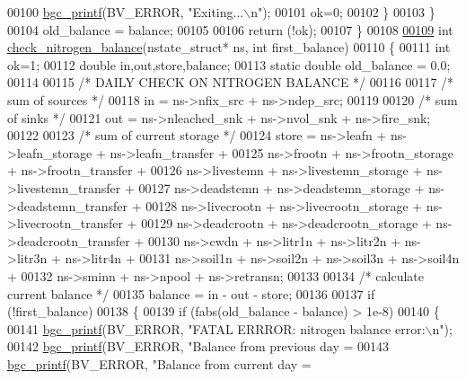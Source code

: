 \begin{DoxyCode}
{{{{{{{{{{{{00100             \hyperlink{bgc__io_8c_af287cce6e2aede1ce337de9319e80d0d}{bgc\_printf}(BV\_ERROR, \textcolor{stringliteral}{"Exiting...\(\backslash\)n"});
00101             ok=0;
00102         \}
00103     \}
00104     old\_balance = balance;
00105 
00106     \textcolor{keywordflow}{return} (!ok);
00107 \}       
00108 
\hypertarget{check__balance_8c_source_l00109}{}\hyperlink{check__balance_8c_a72e7148d8dcce5a86380cf56d81f0955}{00109} \textcolor{keywordtype}{int} \hyperlink{check__balance_8c_a72e7148d8dcce5a86380cf56d81f0955}{check\_nitrogen\_balance}(nstate\_struct* ns, \textcolor{keywordtype}{int} first\_balance)
00110 \{
00111     \textcolor{keywordtype}{int} ok=1;
00112     \textcolor{keywordtype}{double} in,out,store,balance;
00113     \textcolor{keyword}{static} \textcolor{keywordtype}{double} old\_balance = 0.0;
00114 
00115     \textcolor{comment}{/* DAILY CHECK ON NITROGEN BALANCE */}
00116     
00117     \textcolor{comment}{/* sum of sources */}
00118     in = ns->nfix\_src + ns->ndep\_src;
00119     
00120     \textcolor{comment}{/* sum of sinks */}
00121     out = ns->nleached\_snk + ns->nvol\_snk + ns->fire\_snk;
00122         
00123     \textcolor{comment}{/* sum of current storage */}
00124     store = ns->leafn + ns->leafn\_storage + ns->leafn\_transfer +
00125         ns->frootn + ns->frootn\_storage + ns->frootn\_transfer + 
00126         ns->livestemn + ns->livestemn\_storage + ns->livestemn\_transfer + 
00127         ns->deadstemn + ns->deadstemn\_storage + ns->deadstemn\_transfer + 
00128         ns->livecrootn + ns->livecrootn\_storage + ns->livecrootn\_transfer + 
00129         ns->deadcrootn + ns->deadcrootn\_storage + ns->deadcrootn\_transfer + 
00130         ns->cwdn + ns->litr1n + ns->litr2n + ns->litr3n + ns->litr4n +
00131         ns->soil1n + ns->soil2n + ns->soil3n + ns->soil4n +
00132         ns->sminn + ns->npool + ns->retransn;
00133     
00134     \textcolor{comment}{/* calculate current balance */}
00135     balance = in - out - store;
00136      
00137     \textcolor{keywordflow}{if} (!first\_balance)
00138     \{
00139         \textcolor{keywordflow}{if} (fabs(old\_balance - balance) > 1e-8)
00140         \{
00141             \hyperlink{bgc__io_8c_af287cce6e2aede1ce337de9319e80d0d}{bgc\_printf}(BV\_ERROR, \textcolor{stringliteral}{"FATAL ERRROR: nitrogen balance error:\(\backslash\)n"});
00142             \hyperlink{bgc__io_8c_af287cce6e2aede1ce337de9319e80d0d}{bgc\_printf}(BV\_ERROR, \textcolor{stringliteral}{"Balance from previous day = %
00143             \hyperlink{bgc__io_8c_af287cce6e2aede1ce337de9319e80d0d}{bgc\_printf}(BV\_ERROR, \textcolor{stringliteral}{"Balance from current day  = %
}}}}}}}}}}}}}}
\end{DoxyCode}
